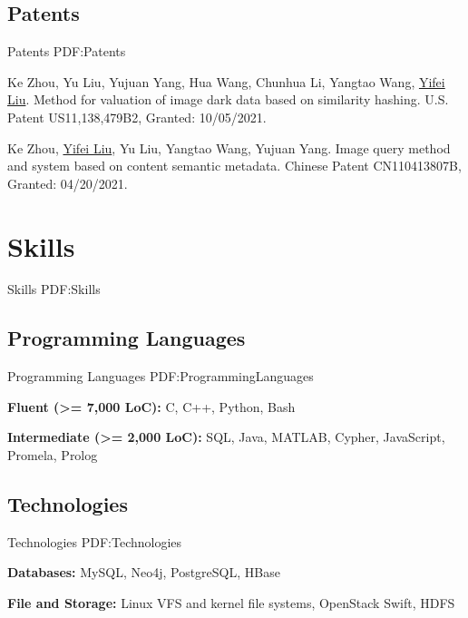 \documentclass[a4paper,10pt,oneside]{article}
\begin{document}
\begin{body}
\subsection
{Patents}
{Patents}
{PDF:Patents}

\NumberedItem{[1]}
Ke Zhou, Yu Liu, Yujuan Yang, Hua Wang, Chunhua Li, Yangtao Wang, \underline{Yifei Liu}. Method for valuation of image dark data based on similarity hashing. U.S. Patent US11,138,479B2, Granted: 10/05/2021. %

\Gap

\NumberedItem{[2]}
Ke Zhou, \underline{Yifei Liu}, Yu Liu, Yangtao Wang, Yujuan Yang. Image query method and system based on content semantic metadata. Chinese Patent CN110413807B, Granted: 04/20/2021. %


\section
{Skills}
{Skills}
{PDF:Skills}

\subsection
{Programming Languages}
{Programming Languages}
{PDF:ProgrammingLanguages}

\BulletItem
\textbf{Fluent (>= 7,000 LoC):} C, C++, Python, Bash

\GapNoBreak

\BulletItem
\textbf{Intermediate (>= 2,000 LoC):} SQL, Java, MATLAB, Cypher, JavaScript, Promela, Prolog



\subsection
{Technologies}
{Technologies}
{PDF:Technologies}

\BulletItem
\textbf{Databases:} MySQL, Neo4j, PostgreSQL, HBase

\GapNoBreak

\BulletItem
\textbf{File and Storage:} Linux VFS and kernel file systems, OpenStack Swift, HDFS



\end{body}
\end{document}
